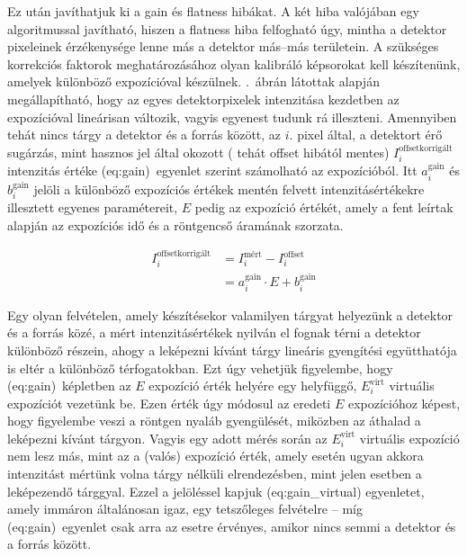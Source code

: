 \documentclass[a4paper,12pt]{article}
\begin{document}
Ez után javíthatjuk ki a gain és flatness hibákat. A két hiba valójában egy algoritmussal javítható, hiszen a flatness hiba felfogható úgy, mintha a detektor pixeleinek érzékenysége lenne más a detektor más--más területein. A szükséges korrekciós faktorok meghatározásához olyan kalibráló képsorokat kell készítenünk, amelyek különböző expozícióval készülnek. .~ábrán látottak alapján megállapítható, hogy az egyes detektorpixelek intenzitása kezdetben az expozícióval lineárisan változik, vagyis egyenest tudunk rá illeszteni. Amennyiben tehát nincs tárgy a detektor és a forrás között, az $i$. pixel által, a detektort érő sugárzás, mint hasznos jel által okozott ( tehát offset hibától mentes) $ I_i^{\text{offsetkorrigált}}$  intenzitás értéke \aref({eq:gain})~egyenlet szerint számolható az expozícióból. Itt $a_i^{\text{gain}}  $ és $b_i^{\text{gain}}$ jelöli a különböző expozíciós értékek mentén felvett intenzitásértékekre illesztett egyenes paramétereit, $E$ pedig az expozíció értékét, amely a fent leírtak alapján az expozíciós idő és a röntgencső áramának szorzata.

\begin{equation}
\label{eq:gain}
\begin{split}
I_i^{\text{offsetkorrigált}}  &=  I_i^{\text{mért}} - I_i^{\text{offset}} \\&=  a_i^{\text{gain}} \cdot E + b_i^{\text{gain}}
\end{split}
\end{equation}

Egy olyan felvételen, amely készítésekor valamilyen tárgyat helyezünk a detektor és a forrás közé, a mért intenzitásértékek nyilván el fognak térni a detektor különböző részein, ahogy a leképezni kívánt tárgy lineáris gyengítési együtthatója is eltér a különböző térfogatokban. Ezt úgy vehetjük figyelembe, hogy  \aref({eq:gain})~képletben az $E$ expozíció érték helyére egy helyfüggő, $E_i^{\text{virt}}$ virtuális expozíciót vezetünk be. Ezen érték úgy módosul az eredeti $E$ expozícióhoz képest, hogy figyelembe veszi a röntgen nyaláb gyengülését, miközben az áthalad a leképezni kívánt tárgyon. Vagyis egy adott mérés során az $E_i^{\text{virt}}$ virtuális expozíció nem lesz más, mint az a (valós) expozíció érték, amely esetén ugyan akkora intenzitást mértünk volna tárgy nélküli elrendezésben, mint jelen esetben a leképezendő tárggyal. Ezzel a jelöléssel kapjuk \aref({eq:gain_virtual}) egyenletet, amely immáron általánosan igaz, egy tetszőleges felvételre -- míg \aref({eq:gain})~egyenlet csak arra az esetre érvényes, amikor nincs semmi a detektor és a forrás között.
\end{document}
